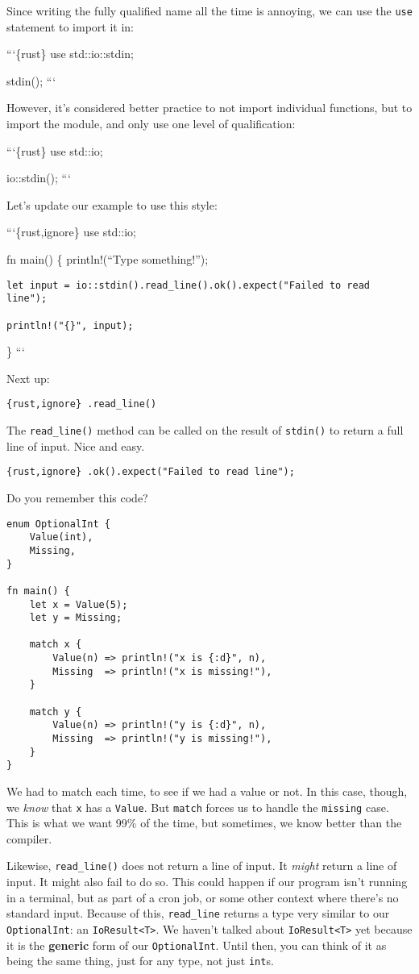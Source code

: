 \documentclass[]{article}
\begin{document}
Since writing the fully qualified name all the time is annoying, we can
use the \texttt{use} statement to import it in:

```\{rust\} use std::io::stdin;

stdin(); ```

However, it's considered better practice to not import individual
functions, but to import the module, and only use one level of
qualification:

```\{rust\} use std::io;

io::stdin(); ```

Let's update our example to use this style:

```\{rust,ignore\} use std::io;

fn main() \{ println!(``Type something!'');

\begin{verbatim}
let input = io::stdin().read_line().ok().expect("Failed to read line");

println!("{}", input);
\end{verbatim}

\} ```

Next up:

\texttt{\{rust,ignore\} .read\_line()}

The \texttt{read\_line()} method can be called on the result of
\texttt{stdin()} to return a full line of input. Nice and easy.

\texttt{\{rust,ignore\} .ok().expect("Failed to read line");}

Do you remember this code?

\begin{verbatim}
enum OptionalInt {
    Value(int),
    Missing,
}

fn main() {
    let x = Value(5);
    let y = Missing;

    match x {
        Value(n) => println!("x is {:d}", n),
        Missing  => println!("x is missing!"),
    }

    match y {
        Value(n) => println!("y is {:d}", n),
        Missing  => println!("y is missing!"),
    }
}
\end{verbatim}

We had to match each time, to see if we had a value or not. In this
case, though, we \emph{know} that \texttt{x} has a \texttt{Value}. But
\texttt{match} forces us to handle the \texttt{missing} case. This is
what we want 99\% of the time, but sometimes, we know better than the
compiler.

Likewise, \texttt{read\_line()} does not return a line of input. It
\emph{might} return a line of input. It might also fail to do so. This
could happen if our program isn't running in a terminal, but as part of
a cron job, or some other context where there's no standard input.
Because of this, \texttt{read\_line} returns a type very similar to our
\texttt{OptionalInt}: an \texttt{IoResult\textless{}T\textgreater{}}. We
haven't talked about \texttt{IoResult\textless{}T\textgreater{}} yet
because it is the \textbf{generic} form of our \texttt{OptionalInt}.
Until then, you can think of it as being the same thing, just for any
type, not just \texttt{int}s.
\end{document}
